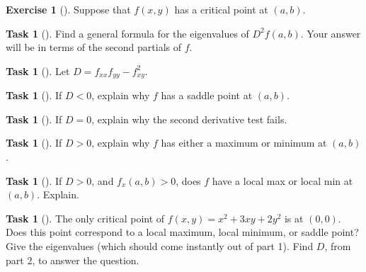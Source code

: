 \documentclass[10pt,]{book}
\theoremstyle{plain}
\theoremstyle{definition}
\theoremstyle{definition}
\theoremstyle{definition}
\theoremstyle{definition}
\newtheorem{exploration}[project]{Exercise}
\newtheorem{task}[project]{Task}
\theoremstyle{definition}
\numberwithin{equation}{section}
\newcommand{\lt}{<}
\begin{document}
\begin{exploration}[]\label{exploration-240}
Suppose that \(f(x,y)\) has a critical point at \((a,b)\).%
\begin{task}[]\label{task-643}
Find a general formula for the eigenvalues of \(D^2f(a,b)\). Your answer will be in terms of the second partials of \(f\).%
\end{task}
\begin{task}[]\label{task-644}
Let \(D=f_{xx}f_{yy}-f_{xy}^2\). \leavevmode%
\begin{itemize}[label=\textbullet]
\begin{task}[]\label{task-645}
If \(D\lt 0\), explain why \(f\) has a saddle point at \((a,b)\).%
\end{task}
\begin{task}[]\label{task-646}
If \(D=0\), explain why the second derivative test fails.%
\end{task}
\begin{task}[]\label{task-647}
If \(D>0\), explain why \(f\) has either a maximum or minimum at \((a,b)\).%
\end{task}
\begin{task}[]\label{task-648}
If \(D>0\), and \(f_x(a,b)>0\), does \(f\) have a local max or local min at \((a,b)\). Explain.%
\end{task}
\end{itemize}
%
\end{task}
\begin{task}[]\label{task-649}
The only critical point of \(f(x,y) = x^2+3xy+2y^2\) is at \((0,0)\).  Does this point correspond to a local maximum, local minimum, or saddle point? Give the eigenvalues (which should come instantly out of part 1). Find \(D\), from part 2, to answer the question.%
\end{task}
\end{exploration}
\typeout{************************************************}
\typeout{************************************************}
\end{document}
